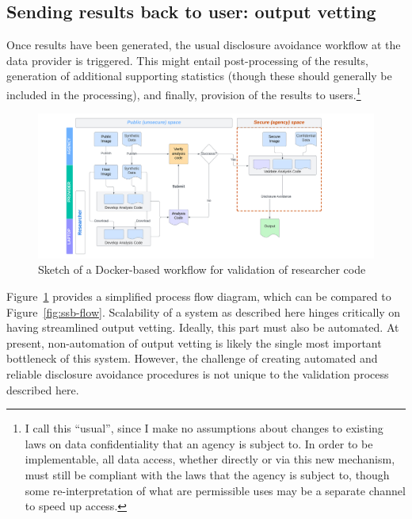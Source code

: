 \documentclass[]{hdsr}
\begin{document}





\subsection{Sending results back to user: output vetting}

Once results have been generated, the usual disclosure avoidance workflow at the data provider is triggered. This might entail post-processing of the results, generation of additional supporting statistics (though these should generally be included in the processing), and finally, provision of the results to users.\footnote{I call this ``usual'', since I make no assumptions about changes to existing laws on data confidentiality that an agency is subject to. In order to be implementable, all data access, whether directly or via this new mechanism, must still be compliant with the laws that the agency is subject to, though some re-interpretation of what are permissible uses may be a separate channel to speed up access.}

\begin{figure}
    \centering
    \includegraphics[width=1\linewidth]{figs/NBER Docker Flow.png}
    \caption{Sketch of a Docker-based workflow for validation of researcher code}
    \label{fig:docker-workflow}
\end{figure}

 Figure~\ref{fig:docker-workflow} provides a simplified process flow diagram, which can be compared to Figure~\ref{fig:ssb-flow}. Scalability of a system as described here hinges critically on having streamlined output vetting. Ideally, this  part must also be automated. At present, non-automation of output vetting is likely the single most important bottleneck of this system. However, the challenge of creating automated and reliable disclosure avoidance procedures is  not unique to the validation process described here.
\end{document}
